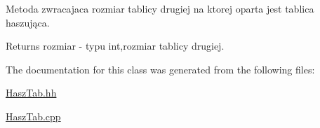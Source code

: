 Metoda zwracajaca rozmiar tablicy drugiej na ktorej oparta jest tablica haszująca. 

\begin{DoxyReturn}{Returns}
rozmiar -\/ typu int,rozmiar tablicy drugiej. 
\end{DoxyReturn}


The documentation for this class was generated from the following files\+:\begin{DoxyCompactItemize}
\item 
\hyperlink{a00012}{Hasz\+Tab.\+hh}\item 
\hyperlink{a00011}{Hasz\+Tab.\+cpp}\end{DoxyCompactItemize}
